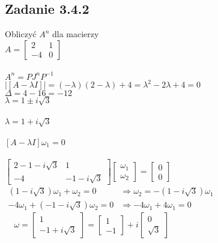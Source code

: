 \pagebreak
\subsection*{Zadanie 3.4.2} {\color{darkgray}
	Obliczyć $A^n$ dla macierzy\\
	$A=\left[ \begin{array}{cc} 2&1\\-4&0\end{array}\right]$
}\\\\
$A^n=PJ^nP^{-1}$\\
$| [A-\lambda I] |=(-\lambda)(2-\lambda)+4=\lambda^2-2\lambda+4=0$\\
$\Delta=4-16=-12$\\
$\lambda=1\pm i\sqrt{3}$\\
\\
$\boxed{\lambda=1+ i\sqrt{3}}$\\
\\
$[A-\lambda I]\omega_1=0$\\
\\
$\left[ \begin{array}{cc}     2-1-i\sqrt{3}&1\\-4&-1-i\sqrt{3}    \end{array}\right]\left[ \begin{array}{c}     \omega_{1}\\\omega_{2}    \end{array}\right]=\left[ \begin{array}{c}     0\\0    \end{array}\right]$\\
$\begin{array}{ll}    (1-i\sqrt{3})\omega_1+\omega_2=0 &\Rightarrow \omega_2=-(1-i\sqrt{3})\omega_1 \\ -4\omega_1+(-1-i\sqrt{3})\omega_2=0&\Rightarrow -4\omega_1+4\omega_1=0\end{array}$\\
$\ \ \ \ \ \omega=\left[ \begin{array}{c}     1\\-1+i\sqrt{3}    \end{array}\right]=\left[ \begin{array}{c}   1\\-1   \end{array}\right]+i\left[ \begin{array}{c}   0\\\sqrt{3}   \end{array}\right]$\\
